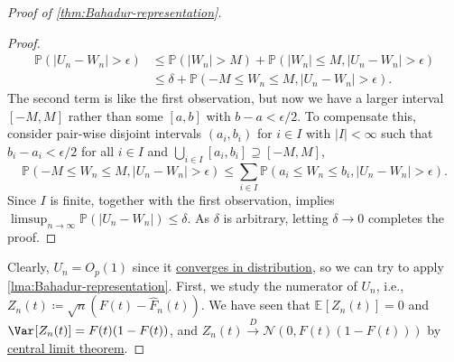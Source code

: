 \begin{proof}[Proof of \autoref{thm:Bahadur-representation}]
\begin{proof}
		\[
			\begin{split}
				\mathbb{P} (\vert U_n - W_n \vert > \epsilon )
				 & \leq \mathbb{P} (\vert W_n \vert > M) + \mathbb{P} (\vert W_n \vert \leq M, \vert U_n - W_n \vert > \epsilon ) \\
				 & \leq \delta + \mathbb{P} (-M \leq W_n \leq M , \vert U_n - W_n \vert > \epsilon ).
			\end{split}
		\]
		The second term is like the first observation, but now we have a larger interval \([-M, M]\) rather than some \([a, b]\) with \(b - a < \epsilon / 2\). To compensate this, consider pair-wise disjoint intervals \((a_i, b_i)\) for \(i \in I\) with \(\vert I \vert < \infty \) such that \(b_i - a_i < \epsilon / 2\) for all \(i \in I\) and \(\bigcup_{i\in I} [a_i, b_i] \supseteq [-M, M]\),
		\[
			\mathbb{P} (-M \leq W_n \leq M , \vert U_n - W_n \vert > \epsilon )
			\leq \sum_{i\in I} \mathbb{P} (a_i \leq W_n \leq b_i, \vert U_n - W_n \vert > \epsilon ).
		\]
		Since \(I\) is finite, together with the first observation, implies \(\limsup_{n \to \infty} \mathbb{P} (\vert U_n - W_n \vert ) \leq \delta\). As \(\delta \) is arbitrary, letting \(\delta \to 0\) completes the proof.
	\end{proof}

	Clearly, \(U_n = O_p(1)\) since it \hyperref[def:converge-in-distribution]{converges in distribution}, so we can try to apply \autoref{lma:Bahadur-representation}. First, we study the numerator of \(U_n\), i.e., \(Z_n(t) \coloneqq \sqrt{n} (F(t) - \hat{F} _n(t))\). We have seen that \(\mathbb{E}_{}[Z_n(t)] = 0\) and \(\Var_{}[Z_n(t)] = F(t) (1 - F(t))\), and \(Z_n(t) \overset{D}{\to} \mathcal{N} (0, F(t) (1 - F(t)))\) by \hyperref[thm:CLT]{central limit theorem}.


\end{proof}
